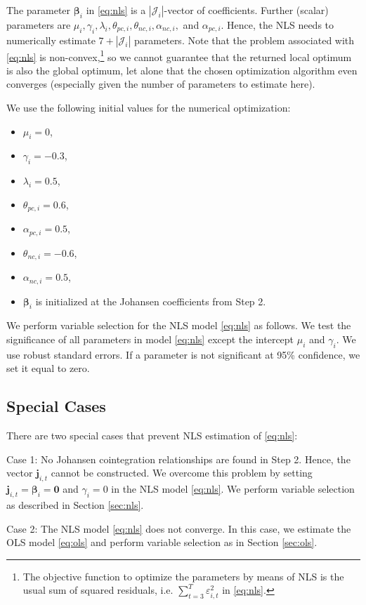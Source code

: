 \documentclass{article}
\begin{document}
The parameter $\bm{\beta}_i$ in \eqref{eq:nls} is a $|\mathcal{J}_i|$-vector of coefficients. Further (scalar) parameters are $\mu_i, \gamma_i, \lambda_i, \theta_{pc,i}, \theta_{nc,i}, \alpha_{nc,i},$ and $\alpha_{pc,i}$. Hence, the NLS needs to numerically estimate $7 + |\mathcal{J}_i|$ parameters. Note that the problem associated with \eqref{eq:nls} is non-convex,\footnote{The objective function to optimize the parameters by means of NLS is the usual sum of squared residuals, i.e. $\sum_{t=3}^T \varepsilon_{i,t}^2$ in \eqref{eq:nls}.} so we cannot guarantee that the returned local optimum is also the global optimum, let alone that the chosen optimization algorithm even converges (especially given the number of parameters to estimate here).

We use the following initial values for the numerical optimization:
\begin{itemize}
    \item $\mu_i = 0$,
    \item $\gamma_i = -0.3$,
    \item $\lambda_i = 0.5$,
    \item $\theta_{pc,i} = 0.6$,
    \item $\alpha_{pc,i} = 0.5$,
    \item $\theta_{nc,i} = -0.6$,
    \item $\alpha_{nc,i} = 0.5$,
    \item $\bm{\beta}_i$ is initialized at the Johansen coefficients from Step 2.
\end{itemize}

We perform variable selection for the NLS model \eqref{eq:nls} as follows. We test the significance of all parameters in model \eqref{eq:nls} except the intercept $\mu_i$ and $\gamma_i$. We use robust standard errors. If a parameter is not significant at 95\% confidence, we set it equal to zero.

\subsection{Special Cases}
There are two special cases that prevent NLS estimation of \eqref{eq:nls}:

Case 1: No Johansen cointegration relationships are found in Step 2. Hence, the vector $\mathbf{j}_{i,t}$ cannot be constructed. We overcome this problem by setting $\mathbf{j}_{i,t} = \bm{\beta}_i = \mathbf{0}$ and $\gamma_i = 0$ in the NLS model \eqref{eq:nls}. We perform variable selection as described in Section \ref{sec:nls}.

Case 2: The NLS model \eqref{eq:nls} does not converge. In this case, we estimate the OLS model \eqref{eq:ols} and perform variable selection as in Section \ref{sec:ols}.
\end{document}
